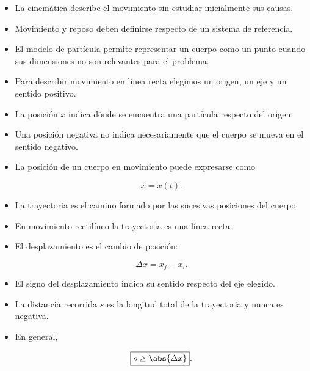 \begin{resumen}

\begin{itemize}

    \item La cinemática describe el movimiento sin estudiar inicialmente sus
    causas.

    \item Movimiento y reposo deben definirse respecto de un sistema de
    referencia.

    \item El modelo de partícula permite representar un cuerpo como un punto
    cuando sus dimensiones no son relevantes para el problema.

    \item Para describir movimiento en línea recta elegimos un origen, un eje
    y un sentido positivo.

    \item La posición \(x\) indica dónde se encuentra una partícula respecto
    del origen.

    \item Una posición negativa no indica necesariamente que el cuerpo se
    mueva en el sentido negativo.

    \item La posición de un cuerpo en movimiento puede expresarse como

    \[
    x=x(t).
    \]

    \item La trayectoria es el camino formado por las sucesivas posiciones
    del cuerpo.

    \item En movimiento rectilíneo la trayectoria es una línea recta.

    \item El desplazamiento es el cambio de posición:

    \[
    \boxed{\Delta x=x_f-x_i}.
    \]

    \item El signo del desplazamiento indica su sentido respecto del eje
    elegido.

    \item La distancia recorrida \(s\) es la longitud total de la trayectoria
    y nunca es negativa.

    \item En general,

    \[
    \boxed{s\geq\abs{\Delta x}}.
    \]


\end{itemize}
\end{resumen}
